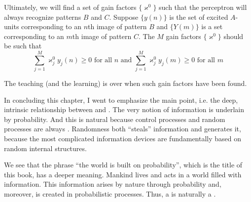 Ultimately, we will find a set of gain factors  $\{ \varkappa^{0} \}$ such that the perceptron will always recognize patterns $B$ and $C$. Suppose  $\{ y(n) \}$ is the set of excited $A$-units corresponding to an $n$th image of pattern
$B$ and  $\{ Y(m) \}$ is a set corresponding to an $m$th image of pattern $C$. The $M$ gain factors $\{ \varkappa^{0} \}$ should be such that 
\begin{equation*}
\sum_{j= 1}^{M} \varkappa^{0}_{j} y_{j} (n)  \geqslant 0 \,\, \text{for all} \,\, n \,\, \text{and} \,\,
\sum_{j= 1}^{M} \varkappa^{0}_{j} y_{j} (m)  \geqslant 0 \,\, \text{for all} \,\, m
\end{equation*}

The teaching (and the learning) is over when such gain factors have been found.

 In concluding this chapter, I went to emphasize the main
point, i.e. the deep, intrinsic relationship between  and . The very notion of information is underlain by
probability. And this is natural because control processes and random
processes are always . Randomness both ``steals''
information and generates it, because the most complicated information
devices are fundamentally based on random internal structures.

We see that the phrase ``the world is built on probability'', which is
the title of this book, has a deeper meaning. Mankind lives and acts in
a world filled with information. This information arises by nature
through probability and, moreover, is created in probabilistic processes.
Thus, a  is naturally a .

